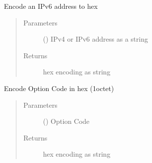 \documentclass[letterpaper,10pt,english]{sphinxmanual}
\begin{document}
\begin{fulllineitems}
\begin{fulllineitems}
\begin{quote}
\begin{description}
\end{description}\end{quote}

\end{fulllineitems}


\begin{fulllineitems}
\label{\detokenize{dhcp_encode-class:bloxone.dhcp_encode.ipv6_address_to_hex}}
\sphinxAtStartPar
Encode an IPv6 address to hex
\begin{quote}\begin{description}
\item[{Parameters}] \leavevmode
\sphinxAtStartPar
{} () \textendash{} IPv4 or IPv6 address as a string

\item[{Returns}] \leavevmode
\sphinxAtStartPar
hex encoding as string

\end{description}\end{quote}

\end{fulllineitems}


\begin{fulllineitems}
\label{\detokenize{dhcp_encode-class:bloxone.dhcp_encode.optcode_to_hex}}
\sphinxAtStartPar
Encode Option Code in hex (1\sphinxhyphen{}octet)
\begin{quote}\begin{description}
\item[{Parameters}] \leavevmode
\sphinxAtStartPar
{} () \textendash{} Option Code

\item[{Returns}] \leavevmode
\sphinxAtStartPar
hex encoding as string

\end{description}\end{quote}


\end{fulllineitems}
\end{fulllineitems}
\end{document}
